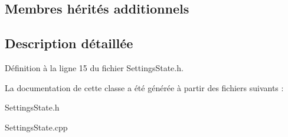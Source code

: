 \subsection*{Membres hérités additionnels}


\subsection{Description détaillée}


Définition à la ligne 15 du fichier Settings\+State.\+h.



La documentation de cette classe a été générée à partir des fichiers suivants \+:\begin{DoxyCompactItemize}
\item 
Settings\+State.\+h\item 
Settings\+State.\+cpp\end{DoxyCompactItemize}
